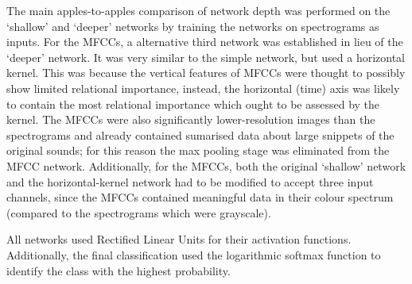 \documentclass[class=report,11pt,crop=false]{standalone}
\begin{document}
The main apples-to-apples comparison of network depth was performed on the `shallow' and `deeper' networks by training the networks on spectrograms as inputs. For the MFCCs, a alternative third network was established in lieu of the `deeper' network. It was very similar to the simple network, but used a horizontal kernel. This was because the vertical features of MFCCs were thought to possibly show limited relational importance, instead, the horizontal (time) axis was likely to contain the most relational importance which ought to be assessed by the kernel. The MFCCs were also significantly lower-resolution images than the spectrograms and already contained sumarised data about large snippets of the original sounds; for this reason the max pooling stage was eliminated from the MFCC network. Additionally, for the MFCCs, both the original `shallow' network and the horizontal-kernel network had to be modified to accept three input channels, since the MFCCs contained meaningful data in their colour spectrum (compared to the spectrograms which were grayscale).

All networks used Rectified Linear Units for their activation functions. Additionally, the final classification used the logarithmic softmax function to identify the class with the highest probability.




\ifstandalone

\printnoidxglossary[type=\acronymtype,nonumberlist]
\fi
\end{document}
